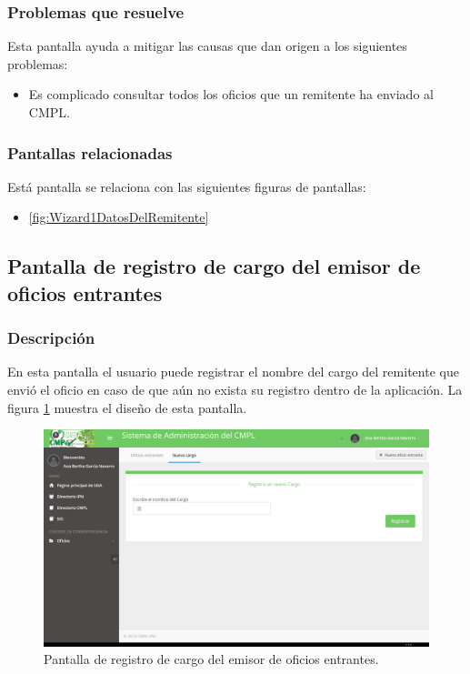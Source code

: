 \subsubsection{Problemas que resuelve}
Esta pantalla ayuda a mitigar las causas que dan origen a los siguientes problemas:

	\begin{itemize}
		\item Es complicado consultar todos los oficios que un remitente ha enviado al CMPL.
	\end{itemize}

\subsubsection{Pantallas relacionadas}
Está pantalla se relaciona con las siguientes figuras de pantallas:
	\begin{itemize}
		\item \ref{fig:Wizard1DatosDelRemitente}
	\end{itemize}

\subsection{Pantalla de registro de cargo del emisor de oficios entrantes}
\subsubsection{Descripción}
	En esta pantalla el usuario puede registrar el nombre del cargo del remitente que envió el oficio en caso de que aún no exista su registro dentro de la aplicación. La figura \ref{fig:NuevoCargoEmisor} muestra el diseño de esta pantalla.		
		
	\begin{figure}[htbp!]
		\centering
			\includegraphics[width=1\textwidth]{Pantallas/NuevoCargoEmisor.png}
		\caption{Pantalla de registro de cargo del emisor de oficios entrantes.}
		\label{fig:NuevoCargoEmisor}
	\end{figure}

